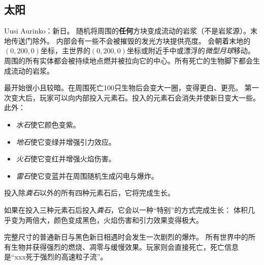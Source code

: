 \documentclass[11pt]{article}
\begin{document}
    \subsection{太阳}\label{subsec:sun}
    Uusi Aurinko：新日。
    随机将周围的\textbf{任何}方块变成流动的岩浆（不是岩浆源）。末地传送门除外。
    内部会有一些不会被摧毁的发光方块提供亮度。
    会朝着末地的$(0, 200, 0)$坐标，主世界的$(0, 200, 0)$坐标或附近手中或漂浮的\textit{微型月球}移动。
    周围的所有实体都会被持续地点燃并被拉向它的中心。所有死亡的生物脚下都会生成流动的岩浆。

    最开始很小且较暗。在周围死亡100只生物后会变大一圈，变得更白、更亮。
    第一次变大后，玩家可以向内部投入元素石。投入的元素石会消失并使新日变大一些。此外：
    \begin{itemize}
        \item \textit{水石}使它颜色变紫。
        \item \textit{地石}使它变绿并增强引力效应。
        \item \textit{火石}使它变红并增强火焰伤害。
        \item \textit{雷石}使它变蓝并在周围随机生成闪电与爆炸。
    \end{itemize}
    投入除\textit{粪石}以外的所有四种元素石后，它将完成生长。

    如果在投入三种元素石后投入\textit{粪石}，它会以一种“特别”的方式完成生长：
    体积几乎变为两倍大，颜色变成黑色，火焰伤害和引力效果变得极大。

    完整尺寸的普通新日与黑色新日相遇时会发生一次剧烈的爆炸。
    所有世界中的所有生物并获得强烈的燃烧、凋零与缓慢效果。玩家则会直接死亡，死亡信息是“xxx死于强烈的高速粒子流”。

    \clearpage
\end{document}
